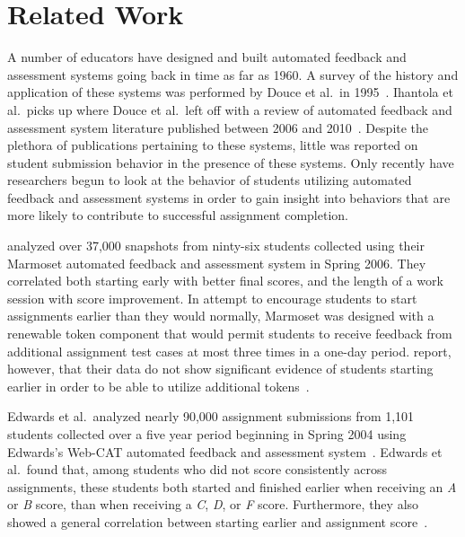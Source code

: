 \section{Related Work}

A number of educators have designed and built automated feedback and assessment
systems going back in time as far as 1960. A survey of the history and
application of these systems was performed by Douce et al.\ in
1995~\cite{Douce:2005:ATA:1163405.1163409}. Ihantola et al.\ picks up where
Douce et al.\ left off with a review of automated feedback and assessment
system literature published between 2006 and
2010~\cite{Ihantola:2010:RRS:1930464.1930480}. Despite the plethora of
publications pertaining to these systems, little was reported on student
submission behavior in the presence of these systems. Only recently have
researchers begun to look at the behavior of students utilizing automated
feedback and assessment systems in order to gain insight into behaviors that
are more likely to contribute to successful assignment completion.

\spacco{} analyzed over 37,000 snapshots from ninty-six students collected
using their Marmoset automated feedback and assessment system in Spring
2006. They correlated both starting early with better final scores, and the
length of a work session with score improvement. In attempt to encourage
students to start assignments earlier than they would normally, Marmoset was
designed with a renewable token component that would permit students to receive
feedback from additional assignment test cases at most three times in a one-day
period. \spacco{} report, however, that their data do not show significant
evidence of students starting earlier in order to be able to utilize additional
tokens~\cite{Spacco:2013:TIP:2462476.2465594, Spacco:2006:EMD:1140124.1140131}.

Edwards et al.\ analyzed nearly 90,000 assignment submissions from 1,101
students collected over a five year period beginning in Spring 2004 using
Edwards's Web-CAT automated feedback and assessment
system~\cite{Edwards:2003:RCS:949344.949390}. Edwards et al.\ found that, among
students who did not score consistently across assignments, these students both
started and finished earlier when receiving an \emph{A} or \emph{B} score, than
when receiving a \emph{C}, \emph{D}, or \emph{F} score. Furthermore, they also
showed a general correlation between starting earlier and assignment
score~\cite{Edwards:2009:CEI:1584322.1584325}.

